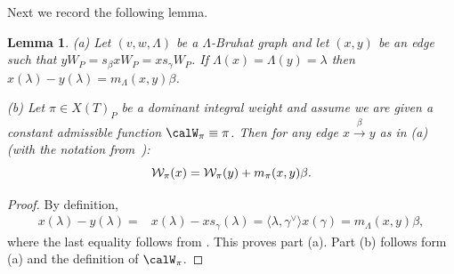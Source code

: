 \documentclass[11pt]{article}
\newtheorem{lemma}[theo]{Lemma}
\theoremstyle{definition}
\numberwithin{equation}{section}
\begin{document}
Next we record the following lemma.
\begin{lemma}\label{maxP} (a) Let $(v,w,\Lambda)$ be a  $\Lambda$-Bruhat graph and let $(x,y)$ be an edge such that
$yW_P = s_\beta x W_P = x s_\gamma W_P$. If $\Lambda(x)=\Lambda(y)=\lambda$ then
$x(\lambda) - y (\lambda) = m_\Lambda(x,y) \beta$.

(b) Let $\pi \in X(T)_P$ be a dominant integral weight and assume we are given a constant admissible function $\calW_\pi \equiv \pi$.
Then for any edge $x\overset{\beta}{\to} y$ as in (a) (with the notation from~): 
\begin{equation}\label{E:Wla} 
\mathcal{W}_\pi(x) = \mathcal{W}_\pi(y) + m_\pi(x,y) \beta \/.
\end{equation}
\end{lemma}
\begin{proof} 
By definition,
\begin{align*}
x(\lambda) - y (\lambda)=& x(\lambda)-xs_\gamma(\lambda)
=\langle \lambda,\gamma^\vee\rangle x(\gamma)
=m_\Lambda(x,y) \beta,
\end{align*}
where the last equality follows from . This proves part (a). Part (b) follows form (a) and 
the definition of $\calW_\pi$.\end{proof}
\end{document}
